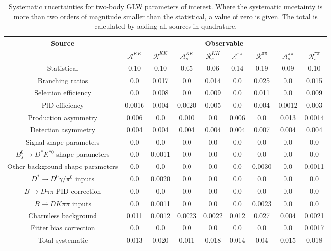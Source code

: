 \begin{sidewaystable}
  \centering
  \begin{tabular}{ccccccccc}
      \toprule
      Source & \multicolumn{8}{c}{Observable} \\
      \midrule
       & $\mathcal{A}^{KK}$ & $\mathcal{R}^{KK}$ & $\mathcal{A}_s^{KK}$ & $\mathcal{R}_{s}^{KK}$ & $\mathcal{A}^{\pi\pi}$ & $\mathcal{R}^{\pi\pi}$ & $\mathcal{A}_s^{\pi\pi}$ & $\mathcal{R}_{s}^{\pi\pi}$ \\
      \midrule
      Statistical & 0.10 & 0.10 & 0.05 & 0.06 & 0.14 & 0.19 & 0.09 & 0.10 \\
      \midrule
      Branching ratios & 0.0  & 0.017 & 0.0  & 0.014 & 0.0  & 0.025 & 0.0  & 0.015 \\
      Selection efficiency & 0.0  & 0.008 & 0.0  & 0.009 & 0.0  & 0.011 & 0.0  & 0.009 \\
      PID efficiency & 0.0016 & 0.004 & 0.0020 & 0.005 & 0.0  & 0.004 & 0.0012 & 0.003 \\
      Production asymmetry & 0.006 & 0.0  & 0.010 & 0.0  & 0.006 & 0.0  & 0.013 & 0.0014 \\
      Detection asymmetry & 0.004 & 0.004 & 0.004 & 0.004 & 0.004 & 0.007 & 0.004 & 0.004 \\
      Signal shape parameters & 0.0  & 0.0  & 0.0  & 0.0  & 0.0  & 0.0  & 0.0  & 0.0  \\
      $B^0_s \to D^* K^{*0}$ shape parameters & 0.0  & 0.0011 & 0.0  & 0.0  & 0.0  & 0.0  & 0.0  & 0.0  \\
      Other background shape parameters & 0.0  & 0.0  & 0.0  & 0.0  & 0.0  & 0.0030 & 0.0  & 0.0011 \\
      $D^* \to D^0 \gamma/\pi^0$ inputs & 0.0  & 0.0020 & 0.0  & 0.0  & 0.0  & 0.0  & 0.0  & 0.0  \\
      $B\to D\pi\pi$ PID correction & 0.0  & 0.0  & 0.0  & 0.0  & 0.0  & 0.0  & 0.0  & 0.0  \\
      $B\to DK\pi\pi$ inputs & 0.0  & 0.0011 & 0.0  & 0.0  & 0.0  & 0.0023 & 0.0  & 0.0  \\
      Charmless background & 0.011 & 0.0012 & 0.0023 & 0.0022 & 0.012 & 0.027 & 0.004 & 0.0021 \\
      Fitter bias correction & 0.0  & 0.0  & 0.0  & 0.0  & 0.0  & 0.0  & 0.0  & 0.0017 \\
      \midrule
      Total systematic & 0.013 & 0.020 & 0.011 & 0.018 & 0.014 & 0.04 & 0.015 & 0.018 \\
      \bottomrule
  \end{tabular}
  \caption{Systematic uncertainties for two-body GLW parameters of interest. Where the systematic uncetainty is more than two orders of magnitude smaller than the statistical, a value of zero is given. The total is calculated by adding all sources in quadrature.}
\label{tab:twoBody_GLW_systematics}
\end{sidewaystable}
